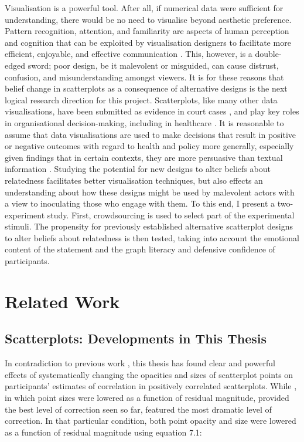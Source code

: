 \documentclass[../main.tex]{subfiles}
\begin{document}
Visualisation is a powerful tool. After all, if numerical data were
sufficient for understanding, there would be no need to visualise beyond
aesthetic preference. Pattern recognition, attention, and familiarity
are aspects of human perception and cognition that can be exploited by
visualisation designers to facilitate more efficient, enjoyable, and
effective communication \cite{franconeri_2021}. This, however, is a
double-edged sword; poor design, be it malevolent or misguided, can
cause distrust, confusion, and misunderstanding amongst viewers. It is
for these reasons that belief change in scatterplots as a consequence of
alternative designs is the next logical research direction for this
project. Scatterplots, like many other data visualisations, have been
submitted as evidence in court cases \cite{bobko_1979}, and play key
roles in organisational decision-making, including in healthcare
\cite{poly_2019}. It is reasonable to assume that data visualisations
are used to make decisions that result in positive or negative outcomes
with regard to health and policy more generally, especially given
findings that in certain contexts, they are more persuasive than textual
information \cite{pandey_2014}. Studying the potential for new designs
to alter beliefs about relatedness facilitates better visualisation
techniques, but also effects an understanding about how these designs
might be used by malevolent actors with a view to inoculating those who
engage with them. To this end, I present a two-experiment study. First,
crowdsourcing is used to select part of the experimental stimuli. The
propensity for previously established alternative scatterplot designs to
alter beliefs about relatedness is then tested, taking into account the
emotional content of the statement and the graph literacy and defensive
confidence of participants.

\section{Related Work}\label{related-work-beliefs}

\subsection{Scatterplots: Developments in This
Thesis}\label{scatterplots-developments-in-this-thesis}

In contradiction to previous work \cite{rensink_2014, rensink_2017},
this thesis has found clear and powerful effects of systematically
changing the opacities and sizes of scatterplot points on participants'
estimates of correlation in positively correlated scatterplots. While
, in which point sizes were lowered as a
function of residual magnitude, provided the best level of correction
seen so far,  featured the most
dramatic level of correction. In that particular condition, both point
opacity and size were lowered as a function of residual magnitude using
equation 7.1:
\end{document}
